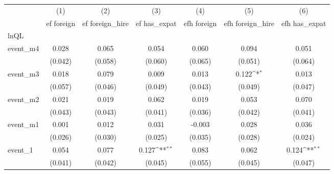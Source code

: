 {
\def\sym#1{\ifmmode^{#1}\else\(^{#1}\)\fi}
\begin{tabular}{l*{6}{c}}
\hline\hline
            &\multicolumn{1}{c}{(1)}&\multicolumn{1}{c}{(2)}&\multicolumn{1}{c}{(3)}&\multicolumn{1}{c}{(4)}&\multicolumn{1}{c}{(5)}&\multicolumn{1}{c}{(6)}\\
            &\multicolumn{1}{c}{ef foreign}&\multicolumn{1}{c}{ef foreign\_hire}&\multicolumn{1}{c}{ef has\_expat}&\multicolumn{1}{c}{efh foreign}&\multicolumn{1}{c}{efh foreign\_hire}&\multicolumn{1}{c}{efh has\_expat}\\
\hline
lnQL        &                     &                     &                     &                     &                     &                     \\
event\_m4    &       0.028         &       0.065         &       0.054         &       0.060         &       0.094         &       0.051         \\
            &     (0.042)         &     (0.058)         &     (0.060)         &     (0.065)         &     (0.051)         &     (0.064)         \\
[1em]
event\_m3    &       0.018         &       0.079         &       0.009         &       0.013         &       0.122\sym{*}  &       0.013         \\
            &     (0.057)         &     (0.046)         &     (0.049)         &     (0.043)         &     (0.049)         &     (0.047)         \\
[1em]
event\_m2    &       0.021         &       0.019         &       0.062         &       0.019         &       0.053         &       0.070         \\
            &     (0.043)         &     (0.043)         &     (0.041)         &     (0.036)         &     (0.042)         &     (0.041)         \\
[1em]
event\_m1    &       0.001         &       0.012         &       0.031         &      -0.003         &       0.028         &       0.036         \\
            &     (0.026)         &     (0.030)         &     (0.025)         &     (0.035)         &     (0.028)         &     (0.024)         \\
[1em]
event\_1     &       0.054         &       0.077         &       0.127\sym{**} &       0.083         &       0.062         &       0.124\sym{**} \\
            &     (0.041)         &     (0.042)         &     (0.045)         &     (0.055)         &     (0.045)         &     (0.047)         \\

\end{tabular}}

